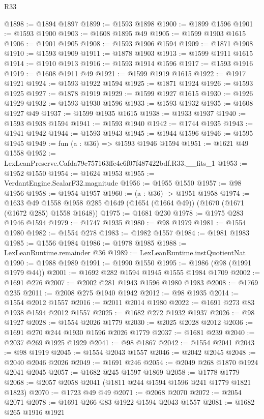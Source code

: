 \begin{lexlean}{R33}
\begin{coremodule}
@1898 := @1894 @1897
@1899 := @1593 @1898
@1900 := @1899 @1596
@1901 := @1593 @1900
@1903 := @1608 @1895 @49
@1905 := @1599 @1903 @1615
@1906 := @1901 @1905
@1908 := @1593 @1906 @1594
@1909 := @1871 @1908
@1910 := @1593 @1909
@1911 := @1878 @1903
@1913 := @1599 @1911 @1615
@1914 := @1910 @1913
@1916 := @1593 @1914 @1596
@1917 := @1593 @1916
@1919 := @1608 @1911 @49
@1921 := @1599 @1919 @1615
@1922 := @1917 @1921
@1924 := @1593 @1922 @1594
@1925 := @1871 @1924
@1926 := @1593 @1925
@1927 := @1878 @1919
@1929 := @1599 @1927 @1615
@1930 := @1926 @1929
@1932 := @1593 @1930 @1596
@1933 := @1593 @1932
@1935 := @1608 @1927 @49
@1937 := @1599 @1935 @1615
@1938 := @1933 @1937
@1940 := @1593 @1938 @1594
@1941 := @1593 @1940
@1942 := @1744 @1935
@1943 := @1941 @1942
@1944 := @1593 @1943
@1945 := @1944 @1596
@1946 := @1595 @1945
@1949 := fun (a : @36) => @1593 @1946 @1594
@1951 := @1621 @49 @1558
@1952 := LexLeanPreserve.Cafda79c757163ffe4c6f07f487422bdf.R33.__fits_1
@1953 := @1952 @1550
@1954 := @1624 @1953
@1955 := VerdantEngine.ScalarF32.magnitude
@1956 := @1955 @1550
@1957 := @98 @1956
@1958 := @1954 @1957
@1960 := (a : @36) -> @1951 @1958
@1974 := @1633
    @49
    @1558
    @1958
    @285
    @1649
    (@1654 (@1664 @49))
    (@1670 (@1671 (@1672 @285) @1558 @1648))
@1975 := @1681 @230
@1978 := @1975 @283 @1946 @1594
@1979 := @1747 @1935
@1980 := @98 @1979
@1981 := @1554 @1980
@1982 := @1554 @278
@1983 := @1982 @1557
@1984 := @1981 @1983
@1985 := @1556 @1984
@1986 := @1978 @1985
@1988 := LexLeanRuntime.remainder @36
@1989 := LexLeanRuntime.instQuotientNat
@1990 := @1988 @1989
@1991 := @1990 @1550
@1995 := @1986 (@98 (@1991 @1979 @44))
@2001 := @1692 @282 @1594 @1945 @1555 @1984 @1709
@2002 := @1691 @276
@2007 := @2002 @281 @1943 @1596 @1980 @1983
@2008 := @1769 @235
@2011 := @2008 @275 @1940 @1942
@2012 := @98 @1935
@2014 := @1554 @2012 @1557
@2016 := @2011 @2014 @1980
@2022 := @1691 @273 @83 @1938 @1594 @2012 @1557
@2025 := @1682 @272 @1932 @1937
@2026 := @98 @1927
@2028 := @1554 @2026 @1779
@2030 := @2025 @2028 @2012
@2036 := @1691 @270 @244 @1930 @1596 @2026 @1779
@2037 := @1681 @239
@2040 := @2037 @269 @1925 @1929
@2041 := @98 @1867
@2042 := @1554 @2041
@2043 := @98 @1919
@2045 := @1554 @2043 @1557
@2046 := @2042 @2045
@2048 := @2040 @2046 @2026
@2049 := @1691 @246
@2054 := @2049 @268 @1870 @1924 @2041 @2045
@2057 := @1682 @245 @1597 @1869
@2058 := @1778 @1779
@2068 := @2057 @2058 @2041 (@1811 @244 @1594 @1596 @241 @1779 @1821 @1823)
@2070 := @1723 @49 @49
@2071 := @2068 @2070
@2072 := @2054 @2071
@2078 := @1691 @266 @83 @1922 @1594 @2043 @1557
@2081 := @1682 @265 @1916 @1921

\end{coremodule}
\end{lexlean}

